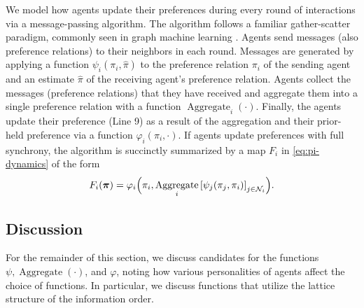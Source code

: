 \documentclass[conference]{ieeeconf}
\newcommand{\N}{\mathcal{N}}
\newcommand{\profile}{\boldsymbol{\pi}}
\DeclareMathOperator{\Aggregate}{Aggregate}
\begin{document}
We model how agents update their preferences during every round of interactions via a message-passing algorithm. The algorithm follows a familiar gather-scatter paradigm, commonly seen in graph machine learning \cite{dudzik2022,dudzik2023}. Agents send messages (also preference relations) to their neighbors in each round. Messages are generated by applying a function $\psi_i(\pi_i,\hat{\pi})$ to the preference relation $\pi_i$ of the sending agent and an estimate $\hat{\pi}$ of the receiving agent's preference relation.
Agents collect the messages (preference relations) that they have received and aggregate them into a single preference relation with a  function $\Aggregate_i(\cdot)$.
Finally, the agents update their preference (Line 9) as a result of the aggregation and their prior-held preference via a function  $\varphi_i(\pi_i,\cdot)$. If agents update preferences with full synchrony, the algorithm is succinctly summarized by a map $F_i$ in \eqref{eq:pi-dynamics} of the form
\begin{align}
    F_i(\profile) = \varphi_i\Bigl(\pi_i, \Aggregate_i{\left[ \psi_j(\pi_j, \pi_i)\right]_{j \in \N_i}} \Bigr). \label{eq:message-passing}
\end{align}

\vspace{-0.25em}
\subsection{Discussion}
\vspace{-0.25em}

For the remainder of this section, we discuss candidates for the functions $\psi, \Aggregate(\cdot)$, and $\varphi$, noting how various personalities of agents affect the choice of functions. In particular, we discuss functions that utilize the lattice structure of the information order.
\end{document}
